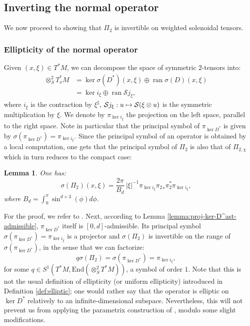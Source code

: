 \documentclass[10pt]{amsart}
\newcommand\mto{\mathchoice{\longmapsto}{\mapsto}{\mapsto}{\mapsto}}
\newcommand{\mc}{\mathcal}
\DeclareMathOperator{\ran}{ran}
\theoremstyle{plain}
\newtheorem{lemma}{Lemma}[section]
\theoremstyle{definition}
\begin{document}
\subsection{Inverting the normal operator}
\label{ssection:inversion}

We now proceed to showing that $\Pi_2$ is invertible on weighted solenoidal tensors.

\subsubsection{Ellipticity of the normal operator}

\label{ssection:uniform-ellipticity}

Given $(x,\xi) \in T^*M$, we can decompose the space of symmetric $2$-tensors into:
\[
\begin{split}
\otimes^2_S T^*_xM & = \ker \sigma(D^*)(x,\xi) \oplus \ran \sigma(D)(x,\xi) \\
& = \ker i_\xi \oplus \ran \mc{S} j_\xi,
\end{split}
\]
where $i_\xi$ is the contraction by $\xi^\sharp$, $\mc{S} j_\xi : u \mto \mc{S}(\xi \otimes u)$ is the symmetric multiplication by $\xi$. We denote by $\pi_{\ker i_\xi}$ the projection on the left space, parallel to the right space. Note in particular that the principal symbol of $\pi_{\ker D^*}$ is given by $\sigma(\pi_{\ker D^*}) = \pi_{\ker i_\xi}$. Since the principal symbol of an operator is obtained by a local computation, one gets that the principal symbol of $\Pi_2$ is also that of $\Pi_{2,\chi}$ which in turn reduces to the compact case:

\begin{lemma}
One has:
\[
\sigma(\Pi_2)(x,\xi) = \dfrac{2\pi}{B_d}\, |\xi|^{-1} \pi_{\ker i_\xi} {\pi_2}_* \pi_2^* \pi_{\ker i_\xi},
\]
where $B_d = \int_0^\pi \sin^{d+3}(\phi) d\phi$.
\end{lemma}

For the proof, we refer to \cite[Th.\,4.4]{Gouezel-Lefeuvre-19}. Next, according to Lemma \ref{lemma:proj-ker-D^ast-admissible}, $\pi_{\ker D^\ast}$ itself is $[0, d]$-admissible. Its principal symbol $\sigma(\pi_{\ker D^\ast}) = \pi_{\ker i_\xi}$ is a projector and $\sigma(\Pi_2)$ is invertible on the range of $\sigma(\pi_{\ker D^\ast})$, in the sense that we can factorize:
\[
q \sigma(\Pi_2) = \sigma(\pi_{\ker D^\ast}) = \pi_{\ker i_\xi},
\]
for some $q \in S^1(T^*M,\mathrm{End}(\otimes^2_S T^*M))$, a symbol of order $1$. Note that this is not the usual definition of ellipticity (or uniform ellipticity) introduced in Definition \ref{def:elliptic}; one would rather say that the operator is elliptic on $\ker D^*$ \ie relatively to an infinite-dimensional subspace. Nevertheless, this will not prevent us from applying the parametrix construction of \cite{Bonthonneau-Lefeuvre-19-1}, modulo some slight modifications.
\end{document}
